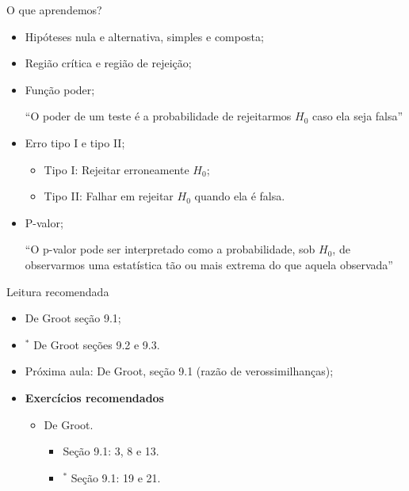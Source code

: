 \begin{frame}{O que aprendemos?}
\begin{itemize}

  \item[\faLightbulbO] Hipóteses nula e alternativa, simples e composta;    
  \item[\faLightbulbO] Região crítica e região de rejeição;
  \item[\faLightbulbO] Função poder;
  
  ``O poder de um teste é a probabilidade de rejeitarmos $H_0$ caso ela seja falsa''
  
  \item[\faLightbulbO] Erro tipo I e tipo II;
  \begin{itemize}
   \item Tipo I: Rejeitar erroneamente $H_0$;
   \item Tipo II: Falhar em rejeitar $H_0$ quando ela é falsa.
  \end{itemize}
  \item[\faLightbulbO] P-valor;
  
  ``O p-valor pode ser interpretado como a probabilidade, sob $H_0$, de observarmos uma estatística tão ou mais extrema do que aquela observada''
  \end{itemize}
 \end{frame}

\begin{frame}{Leitura recomendada}
\begin{itemize}
 \item[\faBook] De Groot seção 9.1;
 \item[\faBook] $^\ast$ De Groot seções 9.2 e 9.3.
 \item[\faForward] Próxima aula: De Groot, seção 9.1 (razão de verossimilhanças);
 \item {\large\textbf{Exercícios recomendados}}
 \begin{itemize}
  \item[\faBookmark] De Groot.
  \begin{itemize}
   \item Seção 9.1: 3, 8 e 13.
   \item $^\ast$ Seção 9.1: 19 e 21.
  \end{itemize}   
  \end{itemize}
 \end{itemize} 
\end{frame}
